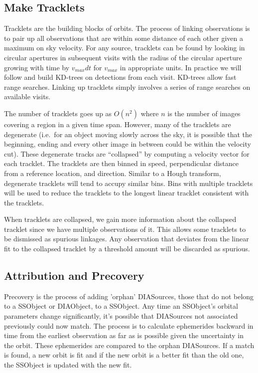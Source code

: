 \subsection{Make Tracklets}
\label{sec:acMakeTracklets}
Tracklets are the building blocks of orbits.  The process of linking observations is to pair up all observations that are within some distance of each other given a maximum on sky velocity.  For any source, tracklets can be found by looking in circular apertures in subsequent visits with the radius of the circular aperture growing with time by $v_{max}dt$ for $v_{max}$ in appropriate units.  In practice we will follow \cite{2007ASPC..376..395K} and build KD-trees on detections from each visit.  KD-trees allow fast range searches.  Linking up tracklets simply involves a series of range searches on available visits.

The number of tracklets goes up as $O(n^2)$ where $n$ is the number of images covering a region in a given time span.  However, many of the tracklets are degenerate (i.e.\ for an object moving slowly across the sky, it is possible that the beginning, ending and every other image in between could be within the velocity cut). These degenerate tracks are ``collapsed'' by computing a velocity vector for each tracklet.  The tracklets are then binned in speed, perpendicular distance from a reference location, and direction.  Similar to a Hough transform, degenerate tracklets will tend to accupy similar bins.  Bins with multiple tracklets will be used to reduce the tracklets to the longest linear tracklet consistent with the tracklets.

When tracklets are collapsed, we gain more information about the collapsed tracklet since we have multiple observations of it.  This allows some tracklets to be dismissed as spurious linkages.  Any observation that deviates from the linear fit to the collapsed tracklet by a threshold amount will be discarded as spurious.

\subsection{Attribution and Precovery}
\label{sec:acAttributionAndPrecovery}
Precovery is the process of adding 'orphan' DIASources, those that do not belong to a SSObject or DIAObject, to a SSObject.  Any time an SSObject's orbital parameters change significantly, it's possible that DIASources not associated previously could now match.  The process is to calculate ephemerides backward in time from the earliest observation as far as is possible given the uncertainty in the orbit.  These ephemerides are compared to the orphan DIASources.  If a match is found, a new orbit is fit and if the new orbit is a better fit than the old one, the SSObject is updated with the new fit.

